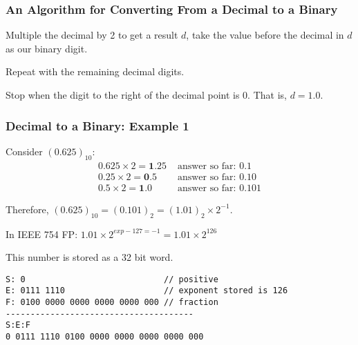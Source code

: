 \begin{frame}\frametitle{An Algorithm for Converting From a Decimal to a Binary}
Multiple the decimal by 2 to get a result $d$, take the value before the decimal in $d$ as our binary digit.
\hfill\break

Repeat with the remaining decimal digits.
\hfill\break

Stop when the digit to the right of the decimal point is 0. That is, $d=1.0$.
\end{frame}

\begin{frame}[fragile]\frametitle{Decimal to a Binary: Example 1}
Consider $(0.625)_{10}$:
\begin{align*}
0.625 \times 2 = \mathbf{1}.25 &\text{ answer so far: 0.1}\\
0.25 \times 2 = \mathbf{0}.5   &\text{ answer so far: 0.10}\\
0.5 \times 2 = \mathbf{1}.0    &\text{ answer so far: 0.101}
\end{align*}

Therefore, $(0.625)_{10} = (0.101)_2=(1.01)_2 \times 2^{-1}$.


In IEEE 754 FP: $1.01 \times 2^{exp-127=-1} = 1.01 \times 2^{126}$

This number is stored as a 32 bit word.
\begin{verbatim}
S: 0                            // positive 
E: 0111 1110                    // exponent stored is 126
F: 0100 0000 0000 0000 0000 000 // fraction
--------------------------------------
S:E:F
0 0111 1110 0100 0000 0000 0000 0000 000
\end{verbatim}

\end{frame}
